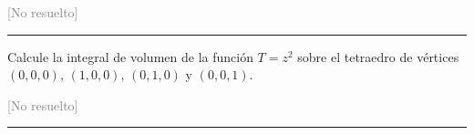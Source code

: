\begin{ejercicio}
  \vspace{-1ex}
  {\footnotesize \textcolor{gray}{[No resuelto]}}
  \medskip
  {\color{gray}
    \hrule
  }
  
\item Calcule la integral de volumen de la función $T=z^2$ sobre el tetraedro
  de vértices $(0,0,0)$, $(1,0,0)$, $(0,1,0)$ y $(0,0,1)$.
  
  {\footnotesize \textcolor{gray}{[No resuelto]}}
  \medskip
  {\color{gray}
    \hrule
  }
  

\end{ejercicio}
